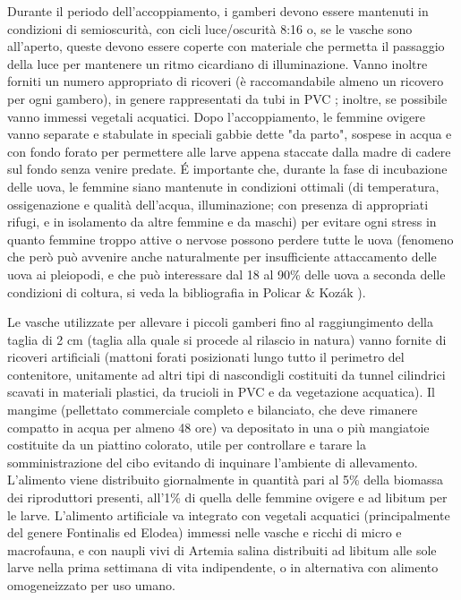 \documentclass[11pt,a4paper,italian,twoside,openany]{memoir}
\begin{document}
Durante il periodo dell'accoppiamento, i gamberi devono essere mantenuti in condizioni di semioscurità, con cicli luce/oscurità 8:16 o, se le vasche sono all'aperto, queste devono essere coperte con materiale che permetta il passaggio della luce per mantenere un ritmo cicardiano di illuminazione. Vanno inoltre forniti un numero appropriato di ricoveri (è raccomandabile almeno un ricovero per ogni gambero), in genere rappresentati da tubi in PVC \cite{Policar 2015}; inoltre, se possibile vanno immessi vegetali acquatici. Dopo l'accoppiamento, le femmine ovigere vanno separate e stabulate in speciali gabbie dette "da parto", sospese in acqua e con fondo forato per permettere alle larve appena staccate dalla madre di cadere sul fondo senza venire predate. É importante che, durante la fase di incubazione delle uova, le femmine siano mantenute in condizioni ottimali (di temperatura, ossigenazione e qualità dell'acqua, illuminazione; con presenza di appropriati rifugi, e in isolamento da altre femmine e da maschi) per evitare ogni stress in quanto femmine troppo attive o nervose possono perdere tutte le uova (fenomeno che però può avvenire anche naturalmente per insufficiente attaccamento delle uova ai pleiopodi, e che può interessare dal 18 al 90\% delle uova a seconda delle condizioni di coltura, si veda la bibliografia in Policar \& Kozák \cite{Policar 2015}).

Le vasche utilizzate per allevare i piccoli gamberi fino al raggiungimento della taglia di 2 cm (taglia alla quale si procede al rilascio in natura) vanno fornite di ricoveri artificiali (mattoni forati posizionati lungo tutto il perimetro del contenitore, unitamente ad altri tipi di nascondigli costituiti da tunnel cilindrici scavati in materiali plastici, da trucioli in PVC e da vegetazione acquatica). Il mangime (pellettato commerciale completo e bilanciato, che deve rimanere compatto in acqua per almeno 48 ore) va depositato in una o più mangiatoie costituite da un piattino colorato, utile per controllare e tarare la somministrazione del cibo evitando di inquinare l'ambiente di allevamento. L'alimento viene distribuito giornalmente in quantità pari al 5\% della biomassa dei riproduttori presenti, all'1\% di quella delle femmine ovigere e ad libitum per le larve. L'alimento artificiale va integrato con vegetali acquatici (principalmente del genere Fontinalis ed Elodea) immessi nelle vasche e ricchi di micro e macrofauna, e con naupli vivi di Artemia salina distribuiti ad libitum alle sole larve nella prima settimana di vita indipendente, o in alternativa con alimento omogeneizzato per uso umano. 
\end{document}
